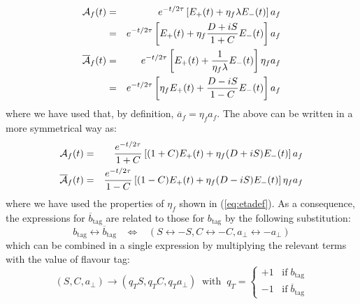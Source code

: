 \documentclass[a4paper,9pt,twoside]{article}
\begin{document}
\begin{eqnarray}
   {\cal A}_f(t)            &=& e^{-t/2\tau} \left[ E_+(t) + \eta_f \lambda E_-(t)  \right] a_f  \\
                            &=&     e^{-t/2\tau} \left[ E_+(t) +\eta_f \frac{D+iS}{1+C} E_-(t)  \right] a_f  \\
   {\overline{\cal A}}_f(t) &=& e^{-t/2\tau} \left[  E_+(t) + \frac{1}{\eta_f\lambda} E_-(t)  \right] \eta_f a_f    \\
                            &=&     e^{-t/2\tau} \left[\eta_f E_+(t) + \frac{D-iS}{1-C} E_-(t)  \right] a_f   
\end{eqnarray}
where we have used that, by definition, $\overline{a}_f = \eta_f a_f$. The above can be
written in a more symmetrical way as:
\begin{eqnarray}
   {\cal A}_f(t)           &=&     \frac{e^{-t/2\tau}}{1+C} \left[ (1+C)E_+(t) +\eta_f (D+iS) E_-(t)  \right] a_f  
\\   {\overline{\cal A}}_f(t) &=&    \frac{e^{-t/2\tau}}{1-C} \left[ (1-C)E_+(t) +\eta_f (D-iS) E_-(t)  \right] \eta_f a_f  
\end{eqnarray}
where we have used the properties of $\eta_f$ shown in (\ref{eq:etadef}).
As a consequence, the expressions for $\overline{b}_\mathrm{tag}$ are related to those for $b_\mathrm{tag}$ by the following substitution:
\begin{equation}
b_\mathrm{tag} \leftrightarrow \overline{b}_\mathrm{tag} \;\;\;\Leftrightarrow\;\;\;  ( S \leftrightarrow -S, C\leftrightarrow -C, a_\perp\leftrightarrow -a_\perp ) 
\end{equation}
which can be combined in a single expression by multiplying the relevant terms with the value of flavour tag:
\begin{equation}
(S,C,a_\perp) \rightarrow (q_T S, q_T C, q_Ta_\perp) \;\; \mathrm{with}\;\; q_T = \left\{\begin{array}{l} +1 \;\;\; \mathrm{if}\; b_\mathrm{tag} \\
                                                                                   -1 \;\;\; \mathrm{if}\; \overline{b}_\mathrm{tag}
\end{array} \right.
\end{equation}
\end{document}
